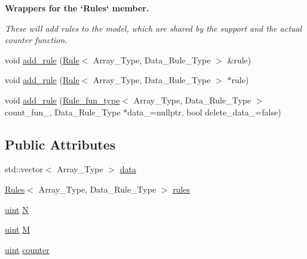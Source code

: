 \begin{Indent}\textbf{ Wrappers for the `\+Rules` member.}\par
{\em These will add rules to the model, which are shared by the support and the actual counter function. }\begin{DoxyCompactItemize}
\item 
void \hyperlink{classbarry_1_1_power_set_a00ee318a40da91bcf0bff79bf71454ab}{add\+\_\+rule} (\hyperlink{classbarry_1_1_rule}{Rule}$<$ Array\+\_\+\+Type, Data\+\_\+\+Rule\+\_\+\+Type $>$ \&rule)
\item 
void \hyperlink{classbarry_1_1_power_set_a6cb8fb8f09b4c190e2ac6c07daa1241e}{add\+\_\+rule} (\hyperlink{classbarry_1_1_rule}{Rule}$<$ Array\+\_\+\+Type, Data\+\_\+\+Rule\+\_\+\+Type $>$ $\ast$rule)
\item 
void \hyperlink{classbarry_1_1_power_set_aae5eae12186fff037efa3884ac2b3dcc}{add\+\_\+rule} (\hyperlink{namespacebarry_aefd7e6d4ba228e2ce1074d075c512178}{Rule\+\_\+fun\+\_\+type}$<$ Array\+\_\+\+Type, Data\+\_\+\+Rule\+\_\+\+Type $>$ count\+\_\+fun\+\_\+, Data\+\_\+\+Rule\+\_\+\+Type $\ast$data\+\_\+=nullptr, bool delete\+\_\+data\+\_\+=false)
\end{DoxyCompactItemize}
\end{Indent}
\subsection*{Public Attributes}
\begin{DoxyCompactItemize}
\item 
std\+::vector$<$ Array\+\_\+\+Type $>$ \hyperlink{classbarry_1_1_power_set_a90fecd17a9d1f36153c07bc929b1630f}{data}
\item 
\hyperlink{classbarry_1_1_rules}{Rules}$<$ Array\+\_\+\+Type, Data\+\_\+\+Rule\+\_\+\+Type $>$ \hyperlink{classbarry_1_1_power_set_ad5486f771bb3161b951100192ce1b2e5}{rules}
\item 
\hyperlink{namespacebarry_a11dfc53ddb4672278319aa04f1e09a6c}{uint} \hyperlink{classbarry_1_1_power_set_adea0f6434b17b3fc391475a11db00c2f}{N}
\item 
\hyperlink{namespacebarry_a11dfc53ddb4672278319aa04f1e09a6c}{uint} \hyperlink{classbarry_1_1_power_set_ae64182a21f9969a2c9fdf73ab23a6c5e}{M}
\item 
\hyperlink{namespacebarry_a11dfc53ddb4672278319aa04f1e09a6c}{uint} \hyperlink{classbarry_1_1_power_set_a54ba0ae826c51b9bd34235bdbe172851}{counter}
\end{DoxyCompactItemize}


